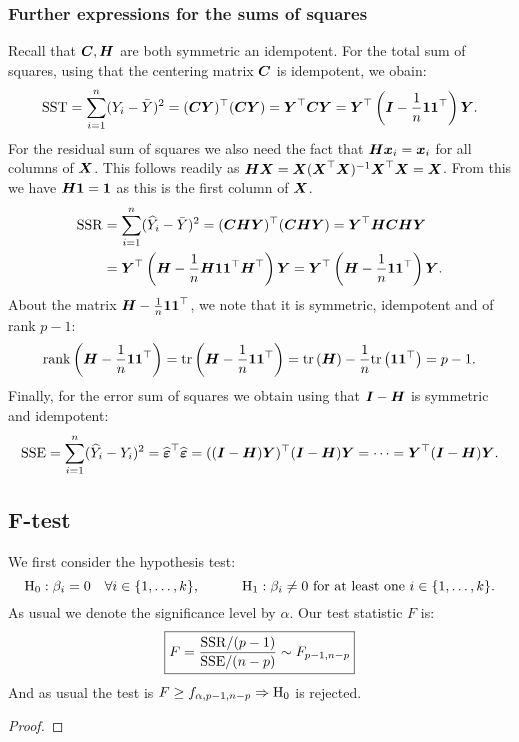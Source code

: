 \subsubsection{Further expressions for the sums of squares}
Recall that $\mC, \mH$ are both symmetric an idempotent. For the total sum of squares, using that the centering matrix $\mC$ is idempotent, we obain:
\begin{align*}
    \mr{SST} = \sum_{i=1}^n(Y_i-\bar{Y})^2 = (\mC\Y)^\top(\mC\Y) = \Y^\top \mC \Y = \Y^\top\brac{\mI-\frac{1}{n}\one\one^\top}\Y.
\end{align*}
For the residual sum of squares we also need the fact that $\mH\x_i=\x_i$ for all columns of $\X$. This follows readily as $\mH\X=\X(\X^\top\X)^{-1}\X^\top\X=\X$. From this we have $\mH\one = \one$ as this is the first column of $\X$. 
\begin{align*}
    \mr{SSR} 
    &= \sum_{i=1}^n(\hat{Y}_i-\bar{Y})^2 
    = (\mC\mH\Y)^\top(\mC\mH\Y) 
    = \Y^\top\mH\mC\mH\Y 
    \\&= \Y^\top\brac{\mH-\frac{1}{n}\mH\one\one^\top\mH^\top}\Y 
    = \Y^\top\brac{\mH-\frac{1}{n}\one\one^\top}\Y.
\end{align*}
About the matrix $\mH-\frac{1}{n}\one\one^\top$, we note that it is symmetric, idempotent and of rank $p-1$:
$$
    \rank{\mH-\frac{1}{n}\one\one^\top} = \tr{\mH-\frac{1}{n}\one\one^\top} = \tr{\mH}-\frac{1}{n}\tr{\one\one^\top}=p-1.
$$
Finally, for the error sum of squares we obtain using that $\mI-\mH$ is symmetric and idempotent:
$$
    \mr{SSE} = \sum_{i=1}^n(\hat{Y}_i-Y_i)^2 = \Eh^\top\Eh = ((\mI-\mH)\Y)^\top(\mI-\mH)\Y = \dots = \Y^\top(\mI-\mH)\Y.
$$
\subsection{F-test}
\label{sec:F_test}
We first consider the hypothesis test:
$$
    \mr{H}_0 : \b_i = 0 \quad\forall i\in\{1,\dots,k\},
    \quad\quad\quad
    \mr{H}_1 : \b_i \ne 0 \textrm{ for at least one } i\in\{1,\dots,k\}.
$$
As usual we denote the significance level by $\alpha$. Our test statistic $F$ is:
\begin{align}
    \boxed{F = \frac{\mr{SSR}/(p-1)}{\mr{SSE}/(n-p)} \sim F_{p-1,n-p}}
\end{align}
And as usual the test is $F \geq f_{\alpha, p-1,n-p} \Rightarrow \mr{H}_0$ is rejected.
\begin{proof}
\end{proof}

